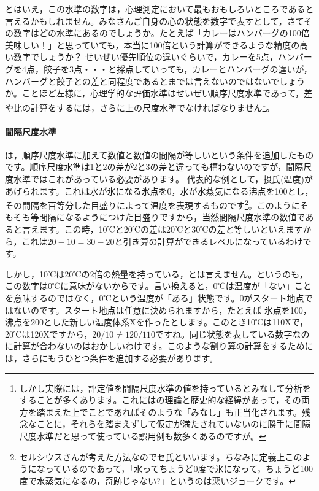 \documentclass{ltjsbook}
\begin{document}
とはいえ，この水準の数字は，心理測定において最もおもしろいところであると言えるかもしれません。みなさんご自身の心の状態を数字で表すとして，さてその数字はどの水準にあるのでしょうか。たとえば「カレーはハンバーグの100倍美味しい！」と思っていても，本当に100倍という計算ができるような精度の高い数字でしょうか？ せいぜい優先順位の違いぐらいで，カレーを5点，ハンバーグを4点，餃子を3点・・・と採点していっても，カレーとハンバーグの違いが，ハンバーグと餃子との差と同程度であるとまでは言えないのではないでしょうか。ことほど左様に，心理学的な評価水準はせいぜい順序尺度水準であって，差や比の計算をするには，さらに上の尺度水準でなければなりません\footnote{しかし実際には，評定値を間隔尺度水準の値を持っているとみなして分析をすることが多くあります。これにはの理論と歴史的な経緯があって，その両方を踏まえた上でことであればそのような「みなし」も正当化されます。残念なことに，それらを踏まえずして仮定が満たされていないのに勝手に間隔尺度水準だと思って使っている誤用例も数多くあるのですが。}。

\paragraph{間隔尺度水準}
は，順序尺度水準に加えて数値と数値の間隔が等しいという条件を追加したものです。順序尺度水準は1と2の差が2と3の差と違っても構わないのですが，間隔尺度水準ではこれがあっている必要があります。
代表的な例として，摂氏(温度)があげられます。これは水が氷になる氷点を0，水が水蒸気になる沸点を100とし，その間隔を百等分した目盛りによって温度を表現するものです\footnote{セルシウスさんが考えた方法なのでセ氏といいます。ちなみに定義上このようになっているのであって，「水ってちょうど0度で氷になって，ちょうど100度で水蒸気になるの，奇跡じゃない?」というのは悪いジョークです。}。このようにそもそも等間隔になるようにつけた目盛りですから，当然間隔尺度水準の数値であると言えます。この時，10℃と20℃の差は20℃と30℃の差と等しいといえますから，これは$20-10=30-20$と引き算の計算ができるレベルになっているわけです。

しかし，10℃は20℃の2倍の熱量を持っている，とは言えません。というのも，この数字は0℃に意味がないからです。言い換えると，0℃は温度が「ない」ことを意味するのではなく，0℃という温度が「ある」状態です。0がスタート地点ではないのです。スタート地点は任意に決められますから，たとえば
氷点を100，沸点を200とした新しい温度体系Xを作ったとします。このとき10℃は110Xで，20℃は120Xですから，$20/10\neq 120/110$ですね。同じ状態を表している数字なのに計算が合わないのはおかしいわけです。このような割り算の計算をするためには，さらにもうひとつ条件を追加する必要があります。
\end{document}
